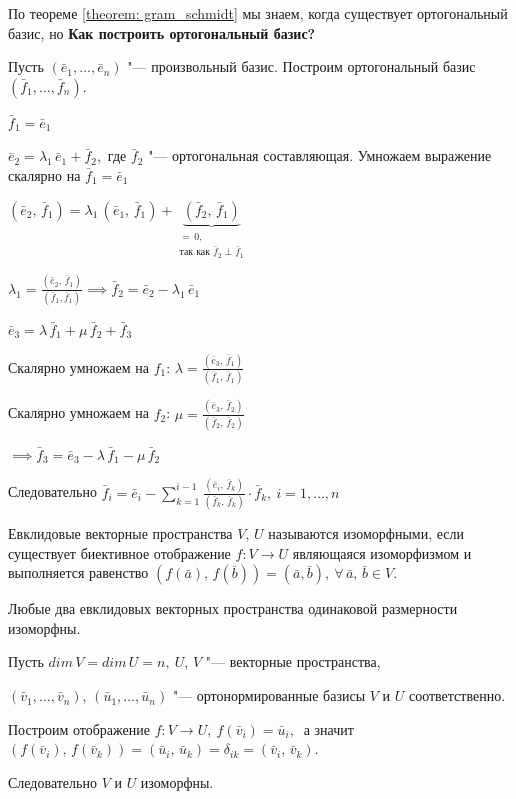 По теореме \ref{theorem: gram_schmidt} мы знаем, когда существует ортогональный базис, но
\textbf{Как построить ортогональный базис?}

Пусть $(\bar{e}_1, \ldots, \bar{e}_n)$ "--- произвольный базис. Построим ортогональный базис $(\bar{f}_1, \ldots, \bar{f}_n)$.

$\bar{f}_1 = \bar{e}_1$

$\bar{e}_2 = \lambda_1 \, \bar{e}_1 + \bar{f}_2,$ где $\bar{f}_2$ "--- ортогональная составляющая. Умножаем выражение скалярно на $\bar{f}_1 = \bar{e}_1$ 

$(\bar{e}_2, \, \bar{f}_1) = \lambda_1 \, (\bar{e}_1, \, \bar{f}_1) + \underbrace{(\bar{f}_2,\, \bar{f}_1)}_{\substack{= \, 0, \\ \text{так как } \bar{f}_2 \; \bot \; \bar{f}_1}}$

$\lambda_1 = \frac{(\bar{e}_2, \, \bar{f}_1)}{(\bar{f}_1, \bar{f}_1)} \implies \bar{f}_2 = \bar{e}_2 - \lambda_1 \, \bar{e}_1$

$\bar{e}_3 = \lambda \, \bar{f}_1 + \mu \, \bar{f}_2 + \bar{f}_3$

Скалярно умножаем на $f_1$: $\lambda = \frac{(\bar{e}_3, \, \bar{f}_1)}{(\bar{f}_1, \, \bar{f}_1)}$

Скалярно умножаем на $f_2$: $\mu = \frac{(\bar{e}_3, \, \bar{f}_2)}{(\bar{f}_2, \, \bar{f}_2)}$

$\implies \bar{f}_3 = \bar{e}_3 - \lambda \, \bar{f}_1 - \mu \, \bar{f}_2$

Следовательно $\bar{f}_i = \bar{e}_i - \sum\limits_{k = 1}^{i - 1} \frac{(\bar{e}_i, \, \bar{f}_k)}{(\bar{f}_k, \, \bar{f}_ k)} \cdot \bar{f}_k, ~ i = 1, \ldots, n$

\begin{definition}
  Евклидовые векторные пространства $V, \, U$ называются изоморфными, если существует биективное отображение $f: V \to U$ являющаяся изоморфизмом и выполняется равенство $(f(\bar{a}), \, f(\bar{b})) = (\bar{a}, \bar{b}),~ \forall \, \bar{a}, \, \bar{b} \in V.$
\end{definition}

\begin{theorem}
  Любые два евклидовых векторных пространства одинаковой размерности изоморфны.
\end{theorem}
\begin{Proof}
  Пусть $dim \, V = dim \, U = n,~ U,\, V$ "--- векторные пространства,

  $(\bar{v}_1, \ldots, \bar{v}_n), \, (\bar{u}_1, \ldots, \bar{u}_n)$ "--- ортонормированные базисы $V$ и $U$ соответственно.

  Построим отображение
  $f: V \to U, ~f(\bar{v}_i) = \bar{u}_i,~$ а значит $(f(\bar{v}_i), \, f(\bar{v}_k)) = (\bar{u}_i, \, \bar{u}_k) = \delta_{ik} = (\bar{v}_i, \, \bar{v}_k)$.

  Следовательно $V$ и $U$ изоморфны.
\end{Proof}

